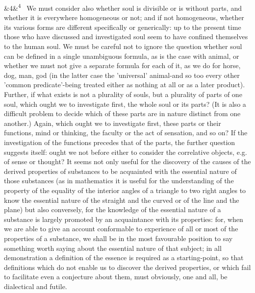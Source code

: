 \documentclass[12pt]{article}
\newcommand{\para}[1][]{\par\noindent\ifx&#1&\else\textsuperscript{\footnotesize #1}~\fi}
\begin{document}
\para[4] We must consider also whether soul is divisible or is without parts, and whether it is everywhere homogeneous or not; and if not homogeneous, whether its various forms are different specifically or generically: up to the present time those who have discussed and investigated soul seem to have confined themselves to the human soul. We must be careful not to ignore the question whether soul can be defined in a single unambiguous formula, as is the case with animal, or whether we must not give a separate formula for each of it, as we do for horse, dog, man, god (in the latter case the 'universal' animal-and so too every other 'common predicate'-being treated either as nothing at all or as a later product). Further, if what exists is not a plurality of souls, but a plurality of parts of one soul, which ought we to investigate first, the whole soul or its parts? (It is also a difficult problem to decide which of these parts are in nature distinct from one another.) Again, which ought we to investigate first, these parts or their functions, mind or thinking, the faculty or the act of sensation, and so on? If the investigation of the functions precedes that of the parts, the further question suggests itself: ought we not before either to consider the correlative objects, e.g. of sense or thought? It seems not only useful for the discovery of the causes of the derived properties of substances to be acquainted with the essential nature of those substances (as in mathematics it is useful for the understanding of the property of the equality of the interior angles of a triangle to two right angles to know the essential nature of the straight and the curved or of the line and the plane) but also conversely, for the knowledge of the essential nature of a substance is largely promoted by an acquaintance with its properties: for, when we are able to give an account conformable to experience of all or most of the properties of a substance, we shall be in the most favourable position to say something worth saying about the essential nature of that subject; in all demonstration a definition of the essence is required as a starting-point, so that definitions which do not enable us to discover the derived properties, or which fail to facilitate even a conjecture about them, must obviously, one and all, be dialectical and futile.
\end{document}
